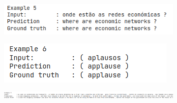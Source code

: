 \documentclass[12pt, a4paper]{book}
\begin{document}
\begin{figure}
\begin{subfigure}{\linewidth}
\begin{flushright}
        \end{flushright}
    \end{subfigure}
    \break
    \begin{subfigure}{\linewidth}
        \begin{flushright}
        \includegraphics[width=\linewidth]{images/examples/6.png}
        \end{flushright}
    \end{subfigure}
    \break
    \begin{subfigure}{\linewidth}
        \begin{flushright}
        \includegraphics[width=\linewidth]{images/examples/7.png}
        \end{flushright}
    \end{subfigure}
    \break
    \begin{subfigure}{\linewidth}
        \begin{flushright}
        \includegraphics[width=\linewidth]{images/examples/8.png}
        \end{flushright}
    \end{subfigure}
    \break
\end{figure}
\end{document}
